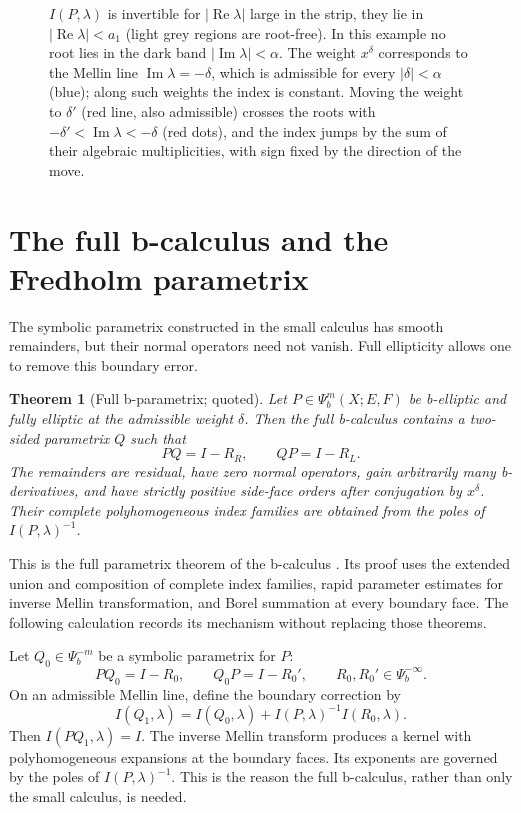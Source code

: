 \documentclass[12pt,oneside,reqno]{article}
\theoremstyle{plain}
\newtheorem{theorem}{Theorem}[section]
\theoremstyle{definition}
\theoremstyle{remark}
\begin{document}
\begin{figure}[htbp]
{\(I(P,\lambda)\) is invertible for \(|\operatorname{Re}\lambda|\) large in
the strip, they lie in \(|\operatorname{Re}\lambda|<a_1\) (light grey
regions are root-free).  In this example no root lies in the dark band
\(|\operatorname{Im}\lambda|<\alpha\).  The weight \(x^\delta\) corresponds to
the Mellin line \(\operatorname{Im}\lambda=-\delta\), which is admissible
for every \(|\delta|<\alpha\) (blue); along such weights the index is
constant.  Moving the weight to \(\delta'\) (red line, also admissible)
crosses the roots with \(-\delta'<\operatorname{Im}\lambda<-\delta\) (red
dots), and the index jumps by the sum of their algebraic multiplicities,
with sign fixed by the direction of the move.}
\end{figure}

\section{The full b-calculus and the Fredholm parametrix}

The symbolic parametrix constructed in the small calculus has smooth
remainders, but their normal operators need not vanish. Full ellipticity
allows one to remove this boundary error.

\begin{theorem}[Full b-parametrix; quoted]
Let \(P\in\Psi_b^m(X;E,F)\) be b-elliptic and fully elliptic at the
admissible weight \(\delta\). Then the full b-calculus contains a two-sided parametrix
\(Q\) such that
\[
 PQ=I-R_R,\qquad QP=I-R_L.
\]
The remainders are residual, have zero normal operators, gain arbitrarily
many b-derivatives, and have strictly positive side-face orders after
conjugation by \(x^\delta\). Their complete polyhomogeneous index families
are obtained from the poles of \(I(P,\lambda)^{-1}\).
\end{theorem}

This is the full parametrix theorem of the b-calculus
\cite[Chapters~4--5]{Melrose}. Its proof uses the extended union and
composition of complete index families, rapid parameter estimates for
inverse Mellin transformation, and Borel summation at every boundary
face. The following calculation records its mechanism without replacing
those theorems.

Let \(Q_0\in\Psi_b^{-m}\) be a symbolic parametrix for \(P\):
\[
 PQ_0=I-R_0,\qquad Q_0P=I-R_0',
 \qquad R_0,R_0'\in\Psi_b^{-\infty}.
\]
On an admissible Mellin line, define the boundary correction by
\[
 I(Q_1,\lambda)
 =
 I(Q_0,\lambda)
 +I(P,\lambda)^{-1}I(R_0,\lambda).
\]
Then \(I(PQ_1,\lambda)=I\). The inverse Mellin transform produces a kernel
with polyhomogeneous expansions at the boundary faces. Its exponents are
governed by the poles of \(I(P,\lambda)^{-1}\). This is the reason the
full b-calculus, rather than only the small calculus, is needed.
\end{document}
